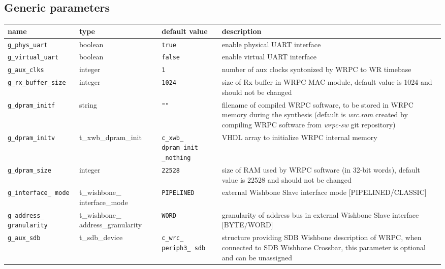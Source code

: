 \subsection{Generic parameters}
\label{sec:adv:generics}

\begin{center}
  \begin{tabular}{|p{3.7cm}|p{3.3cm}|p{2.2cm}|p{5cm}|}
    \hline {\bf name} & {\bf type} & {\bf default value} & {\bf description} \\
    \hline
    \hline
    \texttt{g\_phys\_uart} & boolean & \texttt{true} & enable physical UART interface\\
    \hline
    \texttt{g\_virtual\_uart} & boolean & \texttt{false} & enable virtual UART interface\\
    \hline
    \texttt{g\_aux\_clks} & integer & \texttt{1} & number of aux clocks syntonized by WRPC to WR
    timebase\\
    \hline
    \texttt{g\_rx\_buffer\_size} & integer & \texttt{1024} & size of Rx buffer in WRPC MAC module,
    default value is 1024 and should not be changed\\
    \hline
    \texttt{g\_dpram\_initf} & string & \texttt{""} & filename of compiled WRPC software, to be
    stored in WRPC memory during the synthesis (default is \emph{wrc.ram}
    created by compiling WRPC software from \emph{wrpc-sw} git repository)\\
    \hline
    \texttt{g\_dpram\_initv} & t\_xwb\_dpram\_init &
    \texttt{c\_xwb\_ \linebreak dpram\_init \linebreak \_nothing} & VHDL array to initialize WRPC
    internal memory\\
    \hline
    \texttt{g\_dpram\_size} & integer & \texttt{22528} & size of RAM used by WRPC software (in 32-bit
    words), default value is 22528 and should not be changed\\
    \hline
    \texttt{g\_interface\_ \linebreak mode} & t\_wishbone\_ \linebreak interface\_mode &
    \texttt{PIPELINED} & external Wishbone Slave interface mode
    [PIPELINED/CLASSIC]\\
    \hline
    \texttt{g\_address\_ \linebreak granularity} & t\_wishbone\_ \linebreak
    address\_granularity & \texttt{WORD} & granularity of address bus in
    external Wishbone Slave interface [BYTE/WORD]\\
    \hline
    \texttt{g\_aux\_sdb} & t\_sdb\_device & \texttt{c\_wrc\_ \linebreak
    periph3\_ \linebreak sdb} & structure providing SDB Wishbone description of
    WRPC, when connected to SDB Wishbone Crossbar, this parameter is optional
    and can be unassigned\\
    \hline
  \end{tabular}
\end{center}
